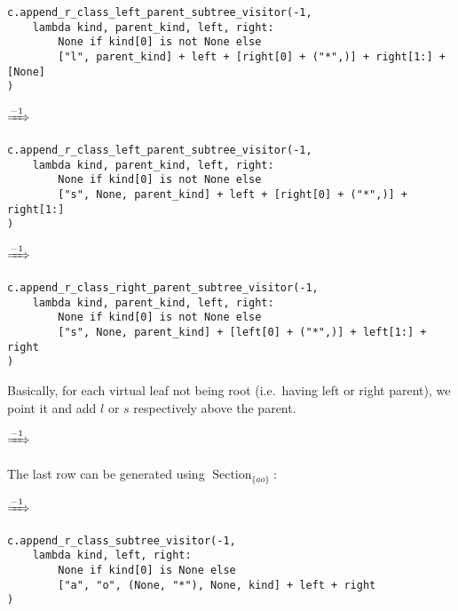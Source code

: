 \documentclass[final]{article}
\theoremstyle{definition}
\theoremstyle{definition}
\theoremstyle{remark}
\DeclareMathOperator{\tSection}{\text{Section}}
\newcommand{\includeinlinesvg}[2]{\begin{minipage}{#1\textwidth}\end{minipage}}
\newcommand{\includeinlinescaledsvg}[3]{\begin{minipage}{#1\textwidth}\begin{center}\end{center}\end{minipage}}
\begin{document}
\begin{lstlisting}
c.append_r_class_left_parent_subtree_visitor(-1,
    lambda kind, parent_kind, left, right:
        None if kind[0] is not None else
        ["l", parent_kind] + left + [right[0] + ("*",)] + right[1:] + [None]
)
\end{lstlisting}

\begin{center}
    \includeinlinescaledsvg{.4}{.7}{lambda__transformations__006a}%
    \(\xRightarrow{-1}\)%
    \includeinlinescaledsvg{.4}{.7}{lambda__transformations__006b}%
\end{center}

\begin{lstlisting}
c.append_r_class_left_parent_subtree_visitor(-1,
    lambda kind, parent_kind, left, right:
        None if kind[0] is not None else
        ["s", None, parent_kind] + left + [right[0] + ("*",)] + right[1:]
)
\end{lstlisting}

\begin{center}
    \includeinlinescaledsvg{.4}{.7}{lambda__transformations__007a}%
    \(\xRightarrow{-1}\)%
    \includeinlinescaledsvg{.4}{.7}{lambda__transformations__007b}%
\end{center}

\begin{lstlisting}
c.append_r_class_right_parent_subtree_visitor(-1,
    lambda kind, parent_kind, left, right:
        None if kind[0] is not None else
        ["s", None, parent_kind] + [left[0] + ("*",)] + left[1:] + right
)
\end{lstlisting}

Basically, for each virtual leaf not being root (i.e.~having left or right parent), we point it and add \(l\) or \(s\) respectively above the parent.

\includeinlinesvg{.32}{lambda__trees_111__1_base}%
\(\xRightarrow{-1}\)%
\includeinlinesvg{.32}{lambda__trees_101__0}%
\includeinlinesvg{.32}{lambda__trees_112__0}%

The last row can be generated using \(\tSection_{\{ao\}}\):

\begin{center}
    \includeinlinescaledsvg{.4}{.7}{lambda__transformations__008a}%
    \(\xRightarrow{-1}\)%
    \includeinlinescaledsvg{.4}{.7}{lambda__transformations__008b}%
\end{center}

\begin{lstlisting}
c.append_r_class_subtree_visitor(-1,
    lambda kind, left, right:
        None if kind[0] is None else
        ["a", "o", (None, "*"), None, kind] + left + right
)
\end{lstlisting}
\end{document}
